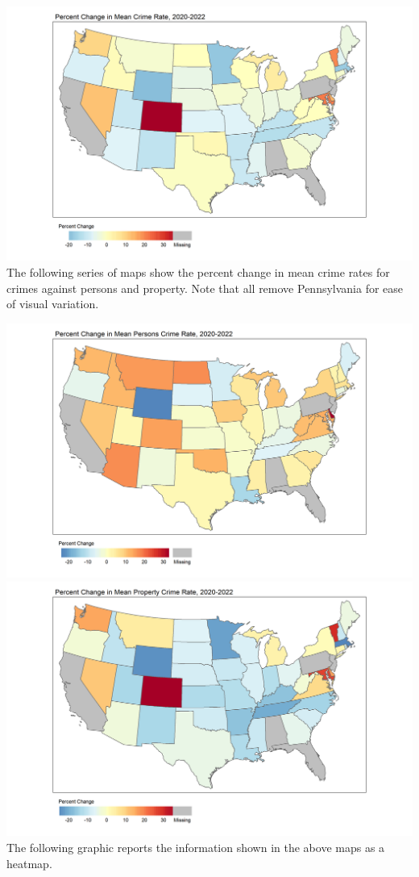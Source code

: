 \documentclass[
  12pt,
]{article}
\begin{document}
\includegraphics{Plots/States_noPA.png} The following series of maps
show the percent change in mean crime rates for crimes against persons
and property. Note that all remove Pennsylvania for ease of visual
variation.

\includegraphics{Plots/States_Person_noPA.png}
\includegraphics{Plots/States_Property_noPA.png} The following graphic
reports the information shown in the above maps as a heatmap.
\end{document}
